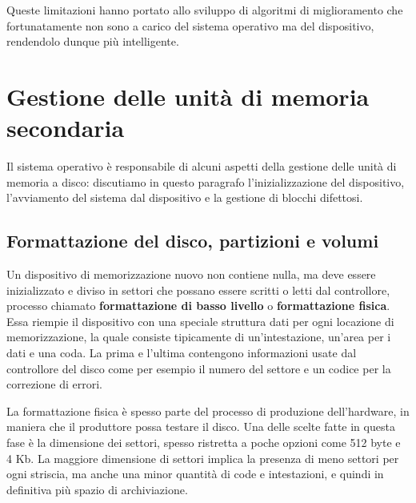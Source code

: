         Queste limitazioni hanno portato allo sviluppo di algoritmi di miglioramento che fortunatamente non sono a carico del sistema operativo ma del dispositivo, rendendolo dunque più intelligente.
        
\section{Gestione delle unità di memoria secondaria}
    Il sistema operativo è responsabile di alcuni aspetti della gestione delle unità di memoria a disco: discutiamo in questo paragrafo l'inizializzazione del dispositivo, l'avviamento del sistema dal dispositivo e la gestione di blocchi difettosi.
    
    \subsection{Formattazione del disco, partizioni e volumi}
        Un dispositivo di memorizzazione nuovo non contiene nulla, ma deve essere inizializzato e diviso in settori che possano essere scritti o letti dal controllore, processo chiamato \textbf{formattazione di basso livello} o \textbf{formattazione fisica}. Essa riempie il dispositivo con una speciale struttura dati per ogni locazione di memorizzazione, la quale consiste tipicamente di un'intestazione, un'area per i dati e una coda. La prima e l'ultima contengono informazioni usate dal controllore del disco come per esempio il numero del settore e un codice per la correzione di errori.
        
        La formattazione fisica è spesso parte del processo di produzione dell'hardware, in maniera che il produttore possa testare il disco. Una delle scelte fatte in questa fase è la dimensione dei settori, spesso ristretta a poche opzioni come 512 byte e 4 Kb. La maggiore dimensione di settori implica la presenza di meno settori per ogni striscia, ma anche una minor quantità di code e intestazioni, e quindi in definitiva più spazio di archiviazione.
        
